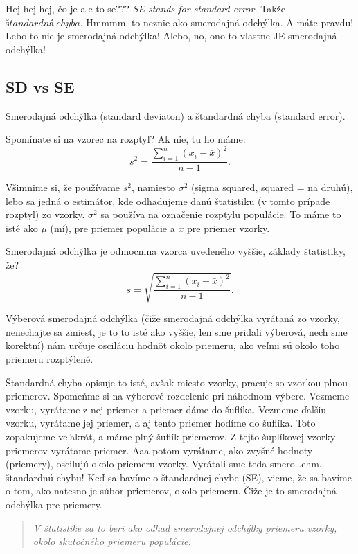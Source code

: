 Hej hej hej, čo je ale to se??? \emph{SE stands for standard error.}
Takže \(štandardná \ chyba\). Hmmmm, to neznie ako smerodajná odchýlka. A
máte pravdu! Lebo to nie je smerodajná odchýlka! Alebo, no, ono to
vlastne JE smerodajná odchýlka!

\hypertarget{sd-vs-se}{%
\subsection{SD vs SE}\label{sd-vs-se}}

Smerodajná odchýlka (standard deviaton) a štandardná chyba (standard
error).

Spomínate si na vzorec na rozptyl? Ak nie, tu ho máme:
\[s^{2} = \frac{\sum_{i=1}^{n} \left(x_{i} - \bar{x}\right)^{2}} {n-1}.\]

Všimnime si, že používame \(s^{2}\), namiesto \(\sigma^{2}\) (sigma
squared, squared = na druhú), lebo sa jedná o estimátor, kde odhadujeme
danú štatistiku (v tomto prípade rozptyl) zo vzorky. \(\sigma^{2}\) sa
používa na označenie rozptylu populácie. To máme to isté ako \(\mu\)
(mí), pre priemer populácie a \(\overline{x}\) pre priemer vzorky.

Smerodajná odchýlka je odmocnina vzorca uvedeného vyššie, základy
štatistiky, že?
\[s = \sqrt{\frac{\sum_{i=1}^{n} \left(x_{i} - \bar{x}\right)^{2}} {n-1}}.\]

Výberová smerodajná odchýlka (čiže smerodajná odchýlka vyrátaná zo
vzorky, nenechajte sa zmiesť, je to to isté ako vyššie, len sme pridali
výberová, nech sme korektní) nám určuje osciláciu hodnôt okolo priemeru,
ako veľmi sú okolo toho priemeru rozptýlené.

Štandardná chyba opisuje to isté, avšak miesto vzorky, pracuje so vzorkou
plnou priemerov. Spomeňme si na výberové rozdelenie pri náhodnom výbere.
Vezmeme vzorku, vyrátame z nej priemer a priemer dáme do šuflíka.
Vezmeme ďalšiu vzorku, vyrátame jej priemer, a aj tento priemer hodíme
do šuflíka. Toto zopakujeme veľakrát, a máme plný šuflík priemerov. Z
tejto šuplíkovej vzorky priemerov vyrátame priemer. Aaa potom vyrátame,
ako zvyšné hodnoty (priemery), oscilujú okolo priemeru vzorky. Vyrátali
sme teda smero\ldots ehm.. štandardnú chybu! Keď sa bavíme o štandardnej
chybe (SE), vieme, že sa bavíme o tom, ako natesno je súbor priemerov,
okolo priemeru. Čiže je to smerodajná odchýlka pre priemery.

\begin{quote}
\emph{V štatistike sa to beri ako odhad smerodajnej odchýlky priemeru
vzorky, okolo skutočného priemeru populácie.}
\end{quote}

